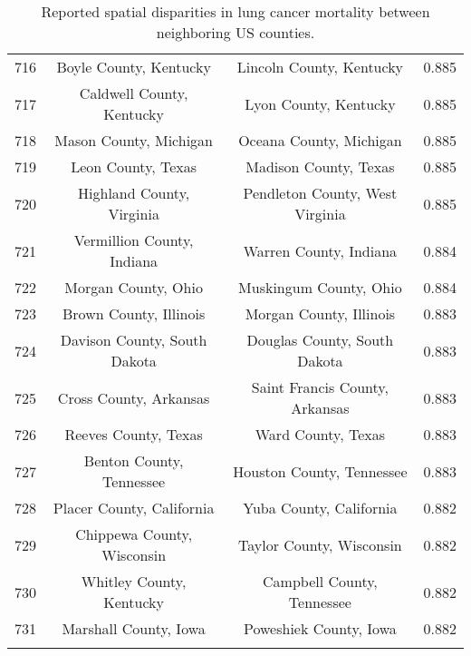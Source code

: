 \begin{longtable}{cccc}
  716 & Boyle County, Kentucky & Lincoln County, Kentucky & 0.885 \\ 
  717 & Caldwell County, Kentucky & Lyon County, Kentucky & 0.885 \\ 
  718 & Mason County, Michigan & Oceana County, Michigan & 0.885 \\ 
  719 & Leon County, Texas & Madison County, Texas & 0.885 \\ 
  720 & Highland County, Virginia & Pendleton County, West Virginia & 0.885 \\ 
  721 & Vermillion County, Indiana & Warren County, Indiana & 0.884 \\ 
  722 & Morgan County, Ohio & Muskingum County, Ohio & 0.884 \\ 
  723 & Brown County, Illinois & Morgan County, Illinois & 0.883 \\ 
  724 & Davison County, South Dakota & Douglas County, South Dakota & 0.883 \\ 
  725 & Cross County, Arkansas & Saint Francis County, Arkansas & 0.883 \\ 
  726 & Reeves County, Texas & Ward County, Texas & 0.883 \\ 
  727 & Benton County, Tennessee & Houston County, Tennessee & 0.883 \\ 
  728 & Placer County, California & Yuba County, California & 0.882 \\ 
  729 & Chippewa County, Wisconsin & Taylor County, Wisconsin & 0.882 \\ 
  730 & Whitley County, Kentucky & Campbell County, Tennessee & 0.882 \\ 
  731 & Marshall County, Iowa & Poweshiek County, Iowa & 0.882 \\ 
   \hline
\hline
\caption{Reported spatial disparities in lung cancer mortality between neighboring US counties.} 
\label{tab:RDA_disparities_table}
\end{longtable}

